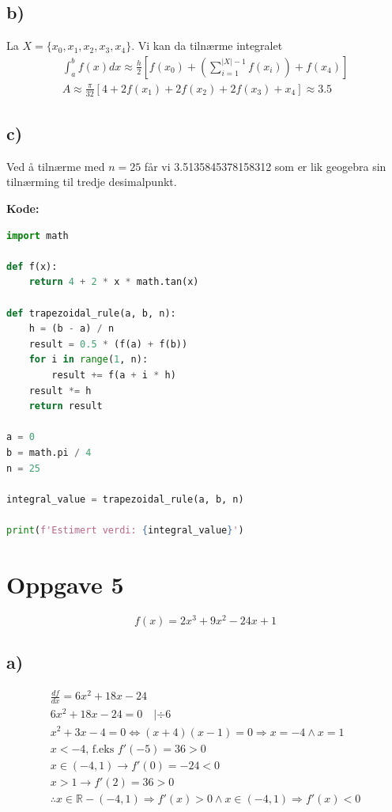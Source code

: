\documentclass[12pt]{article}
\begin{document}
\subsection*{b)}
La \(X = \{x_0, x_1, x_2, x_3, x_4\}\). Vi kan da tilnærme integralet 
\begin{gather*}
  \displaystyle\int_{a}^{b}f(x)dx \approx 
  \frac{h}{2} [f(x_0) 
  + (\displaystyle\sum_{i = 1}^{|X| - 1} f(x_i)) +
  f(x_4) ] \\ 
  \boxed{A \approx \frac{\pi}{32}[4+2f(x_1)+2f(x_2)+2f(x_3)+x_4] \approx 3.5}
\end{gather*}

\break
\subsection*{c)}
Ved å tilnærme med \(n=25\) får vi 3.5135845378158312 som er lik geogebra sin 
tilnærming til tredje desimalpunkt.

\noindent
\textbf{Kode: }
\begin{lstlisting}[language=Python]
import math

def f(x):
    return 4 + 2 * x * math.tan(x)

def trapezoidal_rule(a, b, n):
    h = (b - a) / n
    result = 0.5 * (f(a) + f(b))  
    for i in range(1, n):
        result += f(a + i * h) 
    result *= h  
    return result

a = 0
b = math.pi / 4
n = 25

integral_value = trapezoidal_rule(a, b, n)

print(f'Estimert verdi: {integral_value}')
\end{lstlisting}

\break 
\section*{Oppgave 5}
\[f(x)=2x^3+9x^2-24x+1\]

\subsection*{a)}
\begin{gather*}
  \frac{df}{dx} = 6x^2+18x-24 \\ 
  6x^2 + 18x - 24 = 0 \quad | \div 6 \\ 
  x^2 + 3x - 4 = 0 \Leftrightarrow (x+4)(x-1) = 0 \Rightarrow x = -4 \land x = 1 \\ 
  x < -4 \text{, f.eks } f'(-5)=36 > 0 \\ 
  x \in (-4,1) \rightarrow f'(0)= -24 < 0 \\ 
  x > 1 \rightarrow f'(2) = 36 > 0 \\ 
  \therefore x \in \mathbb R - (-4,1) \Rightarrow f'(x) > 0 
  \land x \in (-4,1) \Rightarrow f'(x) < 0
\end{gather*}
\end{document}
